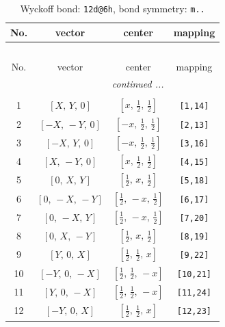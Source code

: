 \documentclass[fleqn,8pt]{jsarticle}
\begin{document}
\begin{longtable}{cccc}
\caption{Wyckoff bond: {\tt 12d@6h}, bond symmetry: {\tt m..}}
 \\
 \hline \hline
No. & vector & center & mapping \\ \hline \endfirsthead

\multicolumn{3}{l}{\tablename\ \thetable{}} \\
 \hline \hline
No. & vector & center & mapping \\ \hline \endhead

 \hline \hline
\multicolumn{3}{r}{\footnotesize\it continued ...} \\ \endfoot

 \hline \hline
\multicolumn{3}{r}{} \\ \endlastfoot

1 & $\left[ X,\, Y,\, 0 \right]$ & $\left[ x,\, \frac{1}{2},\, \frac{1}{2} \right]$ & {\tt [1,14]} \\ \hline
2 & $\left[ - X,\, - Y,\, 0 \right]$ & $\left[ - x,\, \frac{1}{2},\, \frac{1}{2} \right]$ & {\tt [2,13]} \\ \hline
3 & $\left[ - X,\, Y,\, 0 \right]$ & $\left[ - x,\, \frac{1}{2},\, \frac{1}{2} \right]$ & {\tt [3,16]} \\ \hline
4 & $\left[ X,\, - Y,\, 0 \right]$ & $\left[ x,\, \frac{1}{2},\, \frac{1}{2} \right]$ & {\tt [4,15]} \\ \hline
5 & $\left[ 0,\, X,\, Y \right]$ & $\left[ \frac{1}{2},\, x,\, \frac{1}{2} \right]$ & {\tt [5,18]} \\ \hline
6 & $\left[ 0,\, - X,\, - Y \right]$ & $\left[ \frac{1}{2},\, - x,\, \frac{1}{2} \right]$ & {\tt [6,17]} \\ \hline
7 & $\left[ 0,\, - X,\, Y \right]$ & $\left[ \frac{1}{2},\, - x,\, \frac{1}{2} \right]$ & {\tt [7,20]} \\ \hline
8 & $\left[ 0,\, X,\, - Y \right]$ & $\left[ \frac{1}{2},\, x,\, \frac{1}{2} \right]$ & {\tt [8,19]} \\ \hline
9 & $\left[ Y,\, 0,\, X \right]$ & $\left[ \frac{1}{2},\, \frac{1}{2},\, x \right]$ & {\tt [9,22]} \\ \hline
10 & $\left[ - Y,\, 0,\, - X \right]$ & $\left[ \frac{1}{2},\, \frac{1}{2},\, - x \right]$ & {\tt [10,21]} \\ \hline
11 & $\left[ Y,\, 0,\, - X \right]$ & $\left[ \frac{1}{2},\, \frac{1}{2},\, - x \right]$ & {\tt [11,24]} \\ \hline
12 & $\left[ - Y,\, 0,\, X \right]$ & $\left[ \frac{1}{2},\, \frac{1}{2},\, x \right]$ & {\tt [12,23]} \\
\end{longtable}
\end{document}
